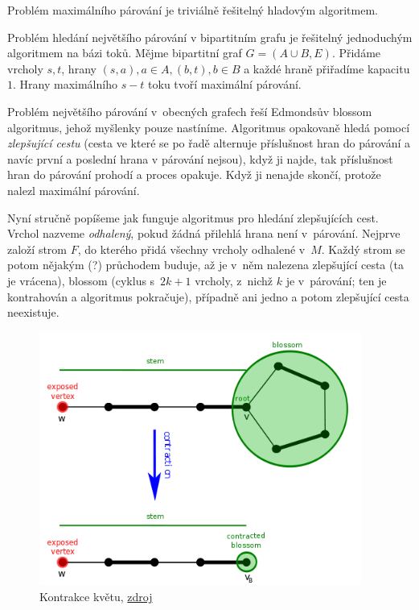 Problém maximálního párování je triviálně řešitelný hladovým
algoritmem.

Problém hledání největšího párování v bipartitním grafu je řešitelný
jednoduchým algoritmem na bázi toků. Mějme bipartitní graf
$G = (A \cup B, E)$. Přidáme vrcholy $s, t$,
hrany $(s, a), a \in A, (b, t), b \in B$ a každé hraně přiřadíme
kapacitu $1$. Hrany maximálního $s-t$ toku tvoří maximální párování.


Problém největšího párování v~obecných grafech řeší Edmondsův blossom
algoritmus, jehož myšlenky pouze nastíníme.
Algoritmus opakovaně hledá pomocí {\em zlepšující
cestu} (cesta ve které
se po řadě alternuje příslušnost hran do párování a navíc první a
poslední hrana v párování nejsou), když ji najde, tak příslušnost hran do
párování prohodí a proces opakuje. Když ji nenajde skončí, protože
nalezl maximální párování.

Nyní stručně popíšeme jak funguje algoritmus pro hledání zlepšujících
cest. Vrchol nazveme {\em odhalený}, pokud žádná přilehlá hrana není v~párování.
Nejprve založí strom $F$, do kterého přidá všechny vrcholy odhalené
v~$M$. Každý strom se potom nějakým (?) průchodem buduje, až je v~něm nalezena zlepšující
cesta (ta je vrácena), blossom (cyklus s~$2k+1$ vrcholy, z~nichž $k$ je
v~párování; ten je kontrahován a algoritmus pokračuje), případně ani
jedno a potom zlepšující cesta neexistuje.

\begin{figure}[H]
    \centering
    \includegraphics[width=300pt]{blossom_contraction.png}
    \caption{Kontrakce květu, \href{https://en.wikipedia.org/wiki/Blossom_algorithm}{zdroj}}
\end{figure}



